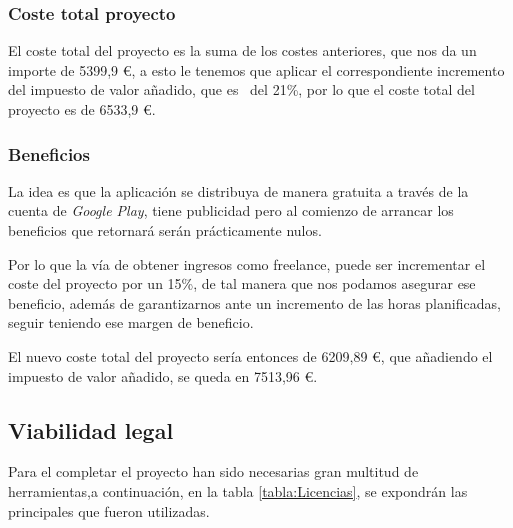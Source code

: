 \subsubsection{Coste total proyecto}
El coste total del proyecto es la suma de los costes anteriores, que nos da un importe de 5399,9 €, a esto le tenemos que aplicar el correspondiente incremento del impuesto de valor añadido, que es~\cite{noauthor_freelancercom_2020} del 21\%, por lo que el coste total del proyecto es de 6533,9 €.

\subsubsection{Beneficios}
La idea es que la aplicación se distribuya de manera gratuita a través de la cuenta de \emph{Google Play}, tiene publicidad pero al comienzo de arrancar los beneficios que retornará serán prácticamente nulos.

Por lo que la vía de obtener ingresos como freelance, puede ser incrementar el coste del proyecto por un 15\%, de tal manera que nos podamos asegurar ese beneficio, además de garantizarnos ante un incremento de las horas planificadas, seguir teniendo ese margen de beneficio.

El nuevo coste total del proyecto sería entonces de 6209,89 €, que añadiendo el impuesto de valor añadido, se queda en 7513,96 €.

\subsection{Viabilidad legal}

Para el completar el proyecto han sido necesarias gran multitud de herramientas,a continuación, en la tabla \ref{tabla:Licencias}, se expondrán las principales que fueron utilizadas.


